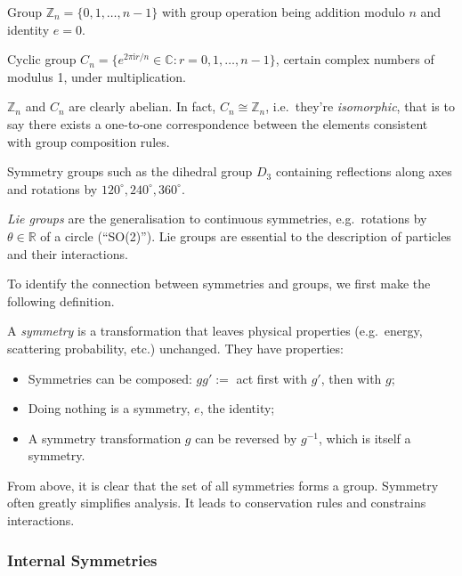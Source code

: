 \documentclass[a4paper,11pt]{article}
\begin{document}
	\begin{ex}
		Group $\mathbb{Z}_n = \{0,1,\dots,n-1\}$ with group operation being addition modulo $n$ and identity $e = 0$.

		Cyclic group $C_n = \{e^{2\pi \mathrm{i} r/n} \in \mathbb{C} : r = 0,1,\dots,n-1\}$, certain complex numbers of modulus 1, under multiplication.

		$\mathbb{Z}_n$ and $C_n$ are clearly abelian. In fact, $C_n \cong \mathbb{Z}_n$, i.e.\ they're \emph{isomorphic}, that is to say there exists a one-to-one correspondence between the elements consistent with group composition rules.
	\end{ex}

	\begin{ex}
		Symmetry groups such as the dihedral group $D_3$  containing reflections along axes and rotations by $120^\circ, 240^\circ, 360^\circ$. 
	\end{ex}
	
	\begin{ex}
		\emph{Lie groups} are the generalisation to continuous symmetries, e.g.\ rotations by $\theta \in \mathbb{R}$ of a circle (``SO(2)''). Lie groups are essential to the description of particles and their interactions.
	\end{ex}

	To identify the connection between symmetries and groups, we first make the following definition.

	\begin{defi}
		A \emph{symmetry} is a transformation that leaves physical properties (e.g.\ energy, scattering probability, etc.) unchanged. They have properties:
		\begin{itemize}
			\item Symmetries can be composed: $gg' :=$ act first with $g'$, then with $g$;
			\item Doing nothing is a symmetry, $e$, the identity;
			\item A symmetry transformation $g$ can be reversed by $g^{-1}$, which is itself a symmetry.
		\end{itemize}
	\end{defi}

	From above, it is clear that the set of all symmetries forms a group. Symmetry often greatly simplifies analysis. It leads to conservation rules and constrains interactions.

	\subsubsection{Internal Symmetries}
\end{document}
